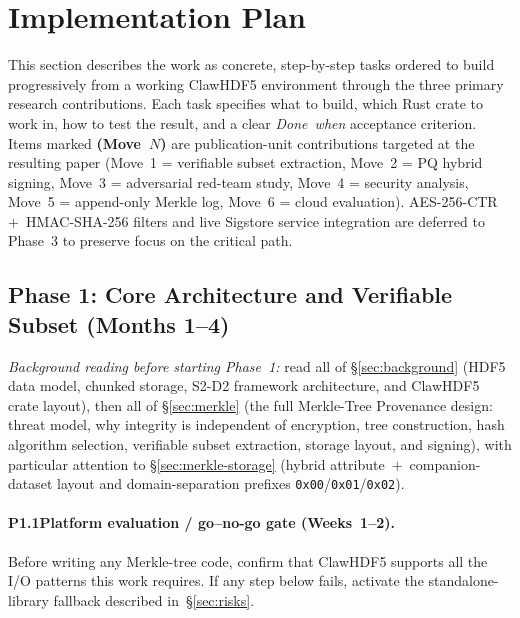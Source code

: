 \documentclass[11pt]{article}
\begin{document}
\section{Implementation Plan}
\label{sec:impl}

This section describes the work as concrete, step-by-step tasks ordered to
build progressively from a working ClawHDF5 environment through the three
primary research contributions. Each task specifies what to build, which Rust
crate to work in, how to test the result, and a clear \emph{Done~when}
acceptance criterion. Items marked \textbf{(Move~$N$)} are publication-unit
contributions targeted at the resulting paper (Move~1 = verifiable subset
extraction, Move~2 = PQ hybrid signing, Move~3 = adversarial red-team study,
Move~4 = security analysis, Move~5 = append-only Merkle log, Move~6 = cloud
evaluation). AES-256-CTR~$+$~HMAC-SHA-256 filters and live Sigstore service
integration are deferred to Phase~3 to preserve focus on the critical path.

\subsection{Phase 1: Core Architecture and Verifiable Subset (Months 1--4)}

\noindent\textit{Background reading before starting Phase~1:} read all of
\S\ref{sec:background} (HDF5 data model, chunked storage, S2-D2 framework
architecture, and ClawHDF5 crate layout), then all of \S\ref{sec:merkle}
(the full Merkle-Tree Provenance design: threat model, why integrity is
independent of encryption, tree construction, hash algorithm selection,
verifiable subset extraction, storage layout, and signing), with particular
attention to \S\ref{sec:merkle-storage} (hybrid attribute~$+$~companion-dataset
layout and domain-separation prefixes \texttt{0x00}/\texttt{0x01}/\texttt{0x02}).

\paragraph{P1.1\enspace Platform evaluation / go--no-go gate (Weeks~1--2).}
Before writing any Merkle-tree code, confirm that ClawHDF5 supports all the
I/O patterns this work requires. If any step below fails, activate the
standalone-library fallback described in~\S\ref{sec:risks}.
\end{document}
